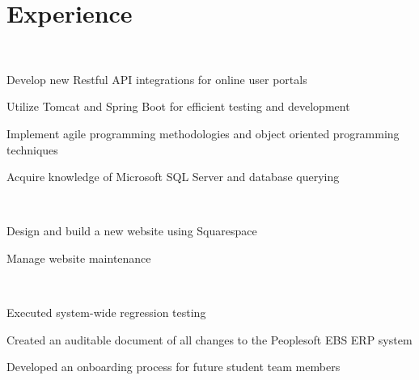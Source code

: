 \documentclass[]{hieudo-build}
\begin{document}
\begin{minipage}[t]{0.65\textwidth} 

\section{Experience}

\\
\vspace{0.9em} %
\begin{tightemize}
\item Develop new Restful API integrations for online user portals
\item Utilize Tomcat and Spring Boot for efficient testing and development
\item Implement agile programming methodologies and object oriented programming techniques
\item Acquire knowledge of Microsoft SQL Server and database querying
\end{tightemize}
\sectionsep

 \\
\begin{tightemize}
\item Design and build a new website using Squarespace
\item Manage website maintenance 
\end{tightemize}
\sectionsep

 \\
\begin{tightemize}
\item Executed system-wide regression testing
\item Created an auditable document of all changes to the Peoplesoft EBS ERP system
\item Developed an onboarding process for future student team members
\end{tightemize}
\sectionsep


\end{minipage}
\end{document}
